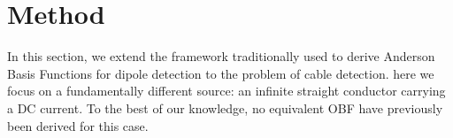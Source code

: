 \section{Method}
\label{sec:methods}
In this section, we extend the framework traditionally used to derive Anderson Basis Functions for dipole detection \cite{Otnes2007,https://doi.org/10.1049/rsn2.70091} to the problem of cable detection. here we focus on a fundamentally different source: an infinite straight conductor carrying a DC current. To the best of our knowledge, no equivalent OBF have previously been derived for this case.







